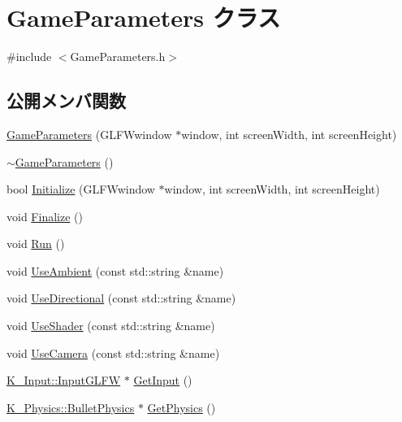 \hypertarget{class_game_parameters}{}\section{Game\+Parameters クラス}
\label{class_game_parameters}


{\ttfamily \#include $<$Game\+Parameters.\+h$>$}

\subsection*{公開メンバ関数}
\begin{DoxyCompactItemize}
\item 
\mbox{\hyperlink{class_game_parameters_a67c9f7c3778fb7cceef8f3d3ebc76cc5}{Game\+Parameters}} (G\+L\+F\+Wwindow $\ast$window, int screen\+Width, int screen\+Height)
\item 
\mbox{\hyperlink{class_game_parameters_ac8659c496d90b1191d38b3e240fc0130}{$\sim$\+Game\+Parameters}} ()
\item 
bool \mbox{\hyperlink{class_game_parameters_a287904839ed6e402c89b3f3a3ce90f7b}{Initialize}} (G\+L\+F\+Wwindow $\ast$window, int screen\+Width, int screen\+Height)
\item 
void \mbox{\hyperlink{class_game_parameters_ad17a8da24d4b91cf1244add083f14465}{Finalize}} ()
\item 
void \mbox{\hyperlink{class_game_parameters_ae3ca4154f788d38285a27a62540880d2}{Run}} ()
\item 
void \mbox{\hyperlink{class_game_parameters_ab2a0cc4710c040091a3d9cd492045861}{Use\+Ambient}} (const std\+::string \&name)
\item 
void \mbox{\hyperlink{class_game_parameters_aed37c53833c53e577ec5ca7baf749040}{Use\+Directional}} (const std\+::string \&name)
\item 
void \mbox{\hyperlink{class_game_parameters_ac5606ec795c47e99ef20f8da2f7d0ed8}{Use\+Shader}} (const std\+::string \&name)
\item 
void \mbox{\hyperlink{class_game_parameters_a886b6f2a939dc5ceadf2667daa327168}{Use\+Camera}} (const std\+::string \&name)
\item 
\mbox{\hyperlink{class_k___input_1_1_input_g_l_f_w}{K\+\_\+\+Input\+::\+Input\+G\+L\+FW}} $\ast$ \mbox{\hyperlink{class_game_parameters_a7f547214ffbdf1a6fffe8f3153fe3d26}{Get\+Input}} ()
\item 
\mbox{\hyperlink{class_k___physics_1_1_bullet_physics}{K\+\_\+\+Physics\+::\+Bullet\+Physics}} $\ast$ \mbox{\hyperlink{class_game_parameters_a6fbc7ef320a7b72f3b7d7833070f5d3c}{Get\+Physics}} ()

\end{DoxyCompactItemize}
